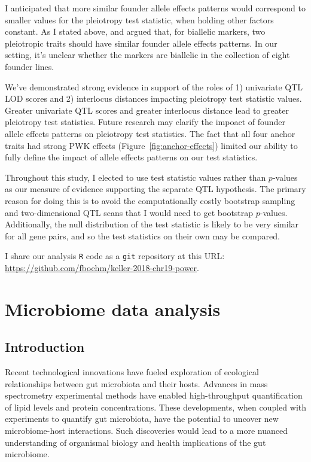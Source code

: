 \documentclass[oneside]{book}\usepackage[]{graphicx}\usepackage[]{color}
\begin{document}
I anticipated that more similar founder allele effects patterns would correspond to 
smaller values for the pleiotropy test statistic, when holding other factors constant.
As I stated above, \citet{macdonald2007joint} and \citet{king2012genetic} argued that,
for biallelic markers, two pleiotropic traits should have similar founder allele effects patterns. 
In our setting, it's unclear whether the markers are biallelic in the collection of eight founder lines.

We've demonstrated strong evidence in support of the roles of 1) univariate QTL LOD scores and
2) interlocus distances impacting pleiotropy test statistic values. 
Greater univariate QTL scores and greater interlocus distance lead to greater pleiotropy test statistics. 
Future research may clarify the impoact of founder allele effects patterns on pleiotropy test statistics. 
The fact that all four anchor traits had strong PWK effects (Figure~\ref{fig:anchor-effects}) limited
our ability to fully define the impact of allele effects patterns on our test statistics.

Throughout this study, I elected to use test statistic values rather than $p$-values as 
our measure of evidence supporting the separate QTL hypothesis.
The primary reason for doing this is to avoid the computationally costly bootstrap
sampling and two-dimensional QTL scans that I would need to get bootstrap $p$-values. Additionally, the null distribution of the test statistic is likely to be very similar for all gene pairs, and so the test statistics on their own may be compared.

I share our analysis \texttt{R} code \citep{r} as a \texttt{git}
repository at this URL: \url{https://github.com/fboehm/keller-2018-chr19-power}.




\section{Microbiome data analysis}\label{sec:microbiome}
\subsection{Introduction}

Recent technological innovations have fueled exploration of ecological relationships between gut microbiota and their hosts. 
Advances in mass spectrometry experimental methods have enabled high-throughput quantification of lipid levels and protein concentrations. 
These developments, when coupled with experiments to quantify gut microbiota, have the potential to uncover new microbiome-host interactions. 
Such discoveries would lead to a more nuanced understanding of organismal biology and health implications of the gut microbiome. 
\end{document}
